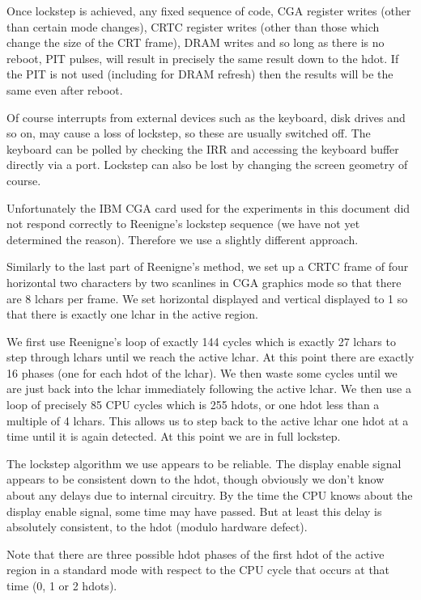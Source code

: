 \documentclass[a4paper,10pt]{amsart}
\begin{document}
Once lockstep is achieved, any fixed sequence of code, CGA register writes
(other than certain mode changes), CRTC register writes (other than those
which change the size of the CRT frame), DRAM writes and so long as there is
no reboot, PIT pulses, will result in precisely the same result down to the
hdot. If the PIT is not used (including for DRAM refresh) then the results
will be the same even after reboot.

Of course interrupts from external devices such as the keyboard, disk drives
and so on, may cause a loss of lockstep, so these are usually switched off.
The keyboard can be polled by checking the IRR and accessing the keyboard
buffer directly via a port. Lockstep can also be lost by changing the screen
geometry of course.

Unfortunately the IBM CGA card used for the experiments in this document
did not respond correctly to Reenigne's lockstep sequence (we have not yet
determined the reason). Therefore we use a slightly different approach.

Similarly to the last part of Reenigne's method, we set up a CRTC frame of
four horizontal two characters by two scanlines in CGA graphics mode so that
there are 8 lchars per frame. We set horizontal displayed and vertical
displayed to 1 so that there is exactly one lchar in the active region.

We first use Reenigne's loop of exactly 144 cycles which is exactly 27
lchars to step through lchars until we reach the active lchar. At this point
there are exactly 16 phases (one for each hdot of the lchar). We then waste
some cycles until we are just back into the lchar immediately following the
active lchar. We then use a loop of precisely 85 CPU cycles which is 255
hdots, or one hdot less than a multiple of 4 lchars. This allows us to step
back to the active lchar one hdot at a time until it is again detected. At
this point we are in full lockstep.

The lockstep algorithm we use appears to be reliable. The display enable
signal appears to be consistent down to the hdot, though obviously we don't
know about any delays due to internal circuitry. By the time the CPU knows
about the display enable signal, some time may have passed. But at least this
delay is absolutely consistent, to the hdot (modulo hardware defect).

Note that there are three possible hdot phases of the first hdot of the
active region in a standard mode with respect to the CPU cycle that occurs at
that time (0, 1 or 2 hdots).
\end{document}
